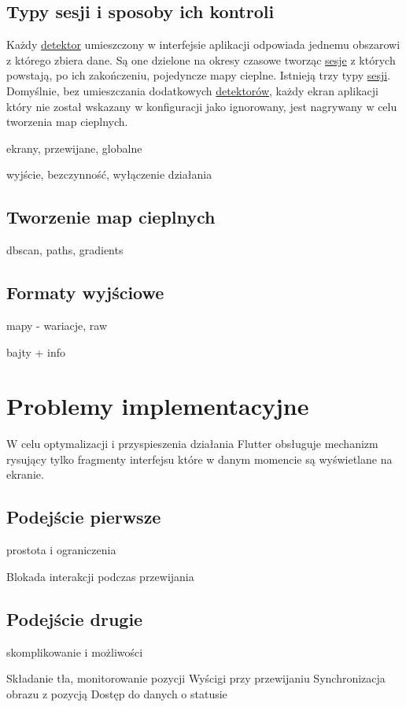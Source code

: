 \subsection{Typy sesji i sposoby ich kontroli}
Każdy \hyperref[par:rs_detectors]{detektor} umieszczony w interfejsie aplikacji odpowiada jednemu obszarowi z którego zbiera dane. Są one dzielone na okresy czasowe tworząc \hyperref[par:rs_session]{sesje} z których powstają, po ich zakończeniu, pojedyncze mapy cieplne. Istnieją trzy typy \hyperref[par:rs_session]{sesji}. Domyślnie, bez umieszczania dodatkowych \hyperref[par:rs_detectors]{detektorów}, każdy ekran aplikacji który nie został wskazany w konfiguracji jako ignorowany, jest nagrywany w celu tworzenia map cieplnych.

ekrany, przewijane, globalne

wyjście, bezczynność, wyłączenie działania

\subsection{Tworzenie map cieplnych}
dbscan, paths, gradients

\subsection{Formaty wyjściowe}
mapy - wariacje, raw

bajty + info

\section{Problemy implementacyjne}
W celu optymalizacji i przyspieszenia działania Flutter obsługuje mechanizm rysujący tylko fragmenty interfejsu które w danym momencie są wyświetlane na ekranie.

\subsection{Podejście pierwsze}
prostota i ograniczenia

Blokada interakcji podczas przewijania

\subsection{Podejście drugie}
skomplikowanie i możliwości

Składanie tła, monitorowanie pozycji
Wyścigi przy przewijaniu
Synchronizacja obrazu z pozycją
Dostęp do danych o statusie
